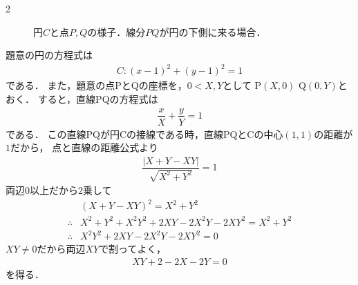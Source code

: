 \documentclass[../../main.tex]{subfiles}
\begin{document}
\begin{multicols}{2}
\begin{figure}[H]
    \caption{円$C$と点$P,Q$の様子．線分$PQ$が円の下側に来る場合．}
    \label{1994-3:fig:2}
  \end{figure}

  題意の円の方程式は
  \begin{align}
    C:(x-1)^2+(y-1)^2=1
  \end{align}
  である．
  また，題意の点PとQの座標を，$0<X,Y$として
  P$(X,0)$ Q$(0,Y)$とおく．
  すると，直線PQの方程式は
  \begin{align}
    \dfrac{x}{X} + \dfrac{y}{Y} = 1
  \end{align}
  である．
  この直線PQが円Cの接線である時，直線PQとCの中心$(1,1)$の距離が$1$だから，
  点と直線の距離公式より
  \begin{align}
    \dfrac{|X+Y-XY|}{\sqrt{X^2+Y^2}} = 1
  \end{align}
  両辺$0$以上だから$2$乗して
  \begin{align}
    & (X+Y-XY)^2 = X^2+Y^2                     \\
    \therefore
    & X^2+Y^2+X^2Y^2+2XY-2X^2Y-2XY^2 = X^2+Y^2 \\
    \therefore
    & X^2Y^2+2XY-2X^2Y-2XY^2 = 0
  \end{align}
  $XY \ne 0$だから両辺$XY$で割ってよく，
  \begin{align}
    XY+2-2X-2Y=0 \label{eq:1}
  \end{align}
  を得る．

  \begin{figure}[H]
    \centering
\end{figure}
\end{multicols}
\end{document}
